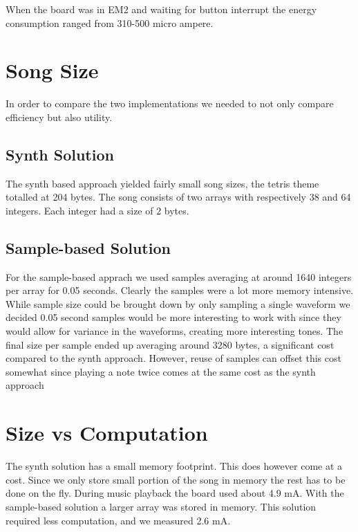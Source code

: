 When the board was in EM2 and waiting for button interrupt the energy consumption ranged from 310-500 micro ampere.

\section{Song Size}
In order to compare the two implementations we needed to not only compare efficiency but also utility. 

\subsection{Synth Solution}
The synth based approach yielded fairly small song sizes, the tetris theme totalled at 204 bytes. The song consists of two arrays with respectively 38 and 64 integers. Each integer had a size of 2 bytes.

\subsection{Sample-based Solution}
For the sample-based apprach we used samples averaging at around 1640 integers per array for 0.05 seconds. Clearly the samples were a lot more memory intensive. While sample size could be brought down by only sampling a single waveform we decided 0.05 second samples would be more interesting to work with since they would allow for variance in the waveforms, creating more interesting tones. The final size per sample ended up averaging around 3280 bytes, a significant cost compared to the synth approach. However, reuse of samples can offset this cost somewhat since playing a note twice comes at the same cost as the synth approach

\section{Size vs Computation}
The synth solution has a small memory footprint. This does however come at a cost. Since we only store small portion of the song in memory the rest has to be done on the fly. During music playback the board used about 4.9 mA. With the sample-based solution a larger array was stored in memory. This solution required less computation, and we measured 2.6 mA.
